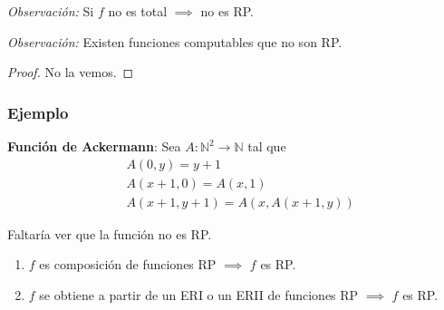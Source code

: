 \bigskip
\textit{Observación:}
Si $f$ no es total $\implies$ no es RP.

\bigskip
\textit{Observación:}
Existen funciones computables que no son RP.

\begin{proof}
    No la vemos.
\end{proof}

\subsubsection{Ejemplo}

%
\textbf{Función de Ackermann}: Sea $A: \mathbb{N}^2 \to \mathbb{N}$ tal que
\begin{align*}
     &A(0,y) = y+1 \\
     &A(x+1,0) = A(x,1) \\
     &A(x+1,y+1) = A(x, A(x+1,y))
\end{align*}

Faltaría ver que la función no es RP.

\bigskip

\begin{teorema}{}{}
   \begin{enumerate}
       \item $f$ es composición de funciones RP $\implies$ $f$ es RP.
       \item $f$ se obtiene a partir de un ERI o un ERII de funciones RP
           $\implies$ $f$ es RP.
   \end{enumerate} 
\end{teorema}

